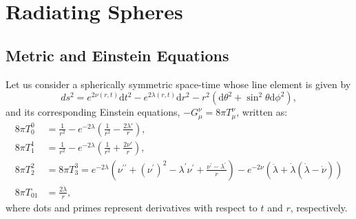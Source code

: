 \documentclass[notitlepage,letterpaper, 10pt]{article}
\begin{document}
\section{Radiating Spheres}
\subsection{Metric and Einstein Equations}
\label{GeneralEquations}
Let us consider a spherically symmetric  space-time whose line element is given by
\begin{equation}
ds^2= e^{2\nu(r,t)}\mathrm{d}t^2-e^{2\lambda(r,t)} \mathrm{d}r^2-r^2(\mathrm{d}\theta^2 + \sin^{2}\theta \mathrm{d}\phi^2), \label{metric}    
\end{equation}
and its corresponding Einstein equations, $-G^\nu_\mu = 8\pi T^\nu_\mu$, written as:
\begin{align}
8\pi T^0_0 &=\frac{1}{r^2} -e^{-2\lambda}\left(\frac{1}{r^2}-\frac{2\lambda'}{r} \right),
\label{EinsEq00} \\
8\pi T^1_1 &= \frac{1}{r^2} -e^{-2\lambda} \left(\frac{1}{r^2}+\frac{2\nu'}{r}\right),
\label{EinsEq11} \\
8\pi T^2_2 &= 8\pi T^3_3 = e^{-2\lambda} \left(\nu^{\prime \prime}+(\nu^{\prime})^2 -\lambda^{\prime}\nu^{\prime} + \frac{\nu^{\prime} - \lambda^{\prime}}{r}\right)
-e^{-2\nu}\left(\ddot{\lambda} +\dot{\lambda}(\dot{\lambda}-\dot{\nu})\right)
\label{EinsEq22} \\
8\pi T_{01} &=\frac{2\dot\lambda}{r},
\label{EinsEq01}
\end{align}
where dots and primes represent derivatives with respect to $t$ and $r$, respectively.
\end{document}
